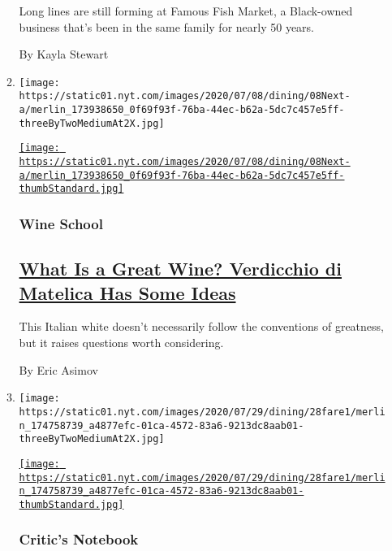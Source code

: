 \begin{enumerate}
\begin{enumerate}
    Long lines are still forming at Famous Fish Market, a Black-owned
    business that's been in the same family for nearly 50 years.

    By Kayla Stewart
  \item
    \texttt{[image: https://static01.nyt.com/images/2020/07/08/dining/08Next-a/merlin\_173938650\_0f69f93f-76ba-44ec-b62a-5dc7c457e5ff-threeByTwoMediumAt2X.jpg]}

    \href{/2020/07/30/dining/drinks/wine-school-verdicchio-di-matelica.html}{\texttt{[image: https://static01.nyt.com/images/2020/07/08/dining/08Next-a/merlin\_173938650\_0f69f93f-76ba-44ec-b62a-5dc7c457e5ff-thumbStandard.jpg]}}

    \hypertarget{wine-school}{%
    \subsubsection{Wine School}\label{wine-school}}

    \hypertarget{what-is-a-great-wine-verdicchio-di-matelica-has-some-ideas}{%
    \subsection{\texorpdfstring{\href{/2020/07/30/dining/drinks/wine-school-verdicchio-di-matelica.html}{What
    Is a Great Wine? Verdicchio di Matelica Has Some
    Ideas}}{What Is a Great Wine? Verdicchio di Matelica Has Some Ideas}}\label{what-is-a-great-wine-verdicchio-di-matelica-has-some-ideas}}

    This Italian white doesn't necessarily follow the conventions of
    greatness, but it raises questions worth considering.

    By Eric Asimov
  \item
    \texttt{[image: https://static01.nyt.com/images/2020/07/29/dining/28fare1/merlin\_174758739\_a4877efc-01ca-4572-83a6-9213dc8aab01-threeByTwoMediumAt2X.jpg]}

    \href{/2020/07/28/dining/melbourne-restaurants-coronavirus.html}{\texttt{[image: https://static01.nyt.com/images/2020/07/29/dining/28fare1/merlin\_174758739\_a4877efc-01ca-4572-83a6-9213dc8aab01-thumbStandard.jpg]}}

    \hypertarget{critics-notebook}{%
    \subsubsection{Critic's Notebook}\label{critics-notebook}}

    \hypertarget{the-pandemic-could-end-the-age-of-midpriced-dining}{%
}
\end{enumerate}
\end{enumerate}
